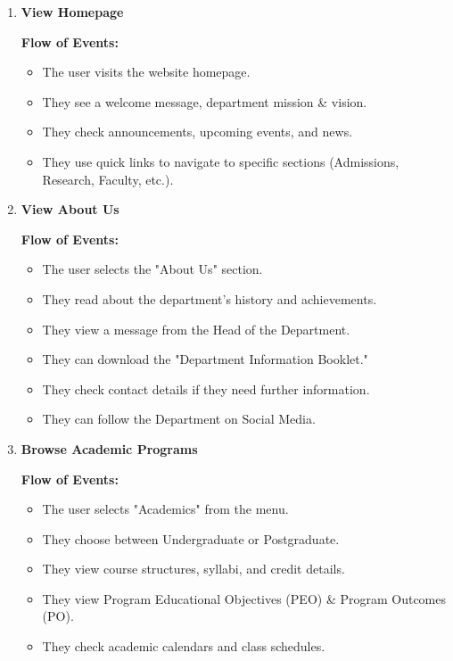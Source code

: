 \documentclass[11pt]{article}
\begin{document}
\begin{enumerate}
    \item \textbf{View Homepage} \par
    \textbf{Flow of Events:}
    \begin{itemize}
        \item The user visits the website homepage.
        \item They see a welcome message, department mission \& vision.
        \item They check announcements, upcoming events, and news.
        \item They use quick links to navigate to specific sections (Admissions, Research, Faculty, etc.).
    \end{itemize}

    \item \textbf{View About Us} \par
    \textbf{Flow of Events:}
    \begin{itemize}
        \item The user selects the "About Us" section.
        \item They read about the department’s history and achievements.
        \item They view a message from the Head of the Department.
        \item They can download the "Department Information Booklet."
        \item They check contact details if they need further information.
        \item They can follow the Department on Social Media.
    \end{itemize}

    \item \textbf{Browse Academic Programs} \par
    \textbf{Flow of Events:}
    \begin{itemize}
        \item The user selects "Academics" from the menu.
        \item They choose between Undergraduate or Postgraduate.
        \item They view course structures, syllabi, and credit details.
        \item They view Program Educational Objectives (PEO) \& Program Outcomes (PO).
        \item They check academic calendars and class schedules.
    \end{itemize}


\end{enumerate}
\end{document}
